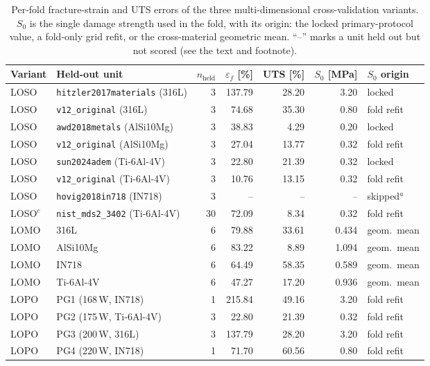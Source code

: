 \documentclass[12pt,a4paper,twocolumn]{article}
\begin{document}
\begin{table}[htbp]
\centering
\caption{Per-fold fracture-strain and UTS errors of the three multi-dimensional cross-validation
variants. $S_0$ is the single damage strength used in the fold, with its origin: the locked
primary-protocol value, a fold-only grid refit, or the cross-material geometric mean. ``--'' marks a unit
held out but not scored (see the text and footnote).}
\label{tab:cv_folds}
\scriptsize
\setlength{\tabcolsep}{3pt}
\begin{tabular}{p{}p{}rrrrp{}}
\toprule
\textbf{Variant} & \textbf{Held-out unit} & \textbf{$n_{\mathrm{held}}$} & \textbf{$\varepsilon_f$ [\%]} & \textbf{UTS [\%]} & \textbf{$S_0$ [MPa]} & \textbf{$S_0$ origin} \\
\midrule
LOSO & \texttt{hitzler2017materials} (316L) & 3 & 137.79 & 28.20 & 3.20 & locked \\
LOSO & \texttt{v12\_original} (316L) & 3 & 74.68 & 35.30 & 0.80 & fold refit \\
LOSO & \texttt{awd2018metals} (AlSi10Mg) & 3 & 38.83 & 4.29 & 0.20 & locked \\
LOSO & \texttt{v12\_original} (AlSi10Mg) & 3 & 27.04 & 13.77 & 0.32 & fold refit \\
LOSO & \texttt{sun2024adem} (Ti-6Al-4V) & 3 & 22.80 & 21.39 & 0.32 & locked \\
LOSO & \texttt{v12\_original} (Ti-6Al-4V) & 3 & 10.76 & 13.15 & 0.32 & fold refit \\
LOSO & \texttt{hovig2018in718} (IN718) & 3 & -- & -- & -- & skipped$^{a}$ \\
LOSO$^{c}$ & \texttt{nist\_mds2\_3402} (Ti-6Al-4V) & 30 & 72.09 & 8.34 & 0.32 & fold refit \\
\midrule
LOMO & 316L & 6 & 79.88 & 33.61 & 0.434 & geom.\ mean \\
LOMO & AlSi10Mg & 6 & 83.22 & 8.89 & 1.094 & geom.\ mean \\
LOMO & IN718 & 6 & 64.49 & 58.35 & 0.589 & geom.\ mean \\
LOMO & Ti-6Al-4V & 6 & 47.27 & 17.20 & 0.936 & geom.\ mean \\
\midrule
LOPO & PG1 (168\,W, IN718) & 1 & 215.84 & 49.16 & 3.20 & fold refit \\
LOPO & PG2 (175\,W, Ti-6Al-4V) & 3 & 22.80 & 21.39 & 0.32 & fold refit \\
LOPO & PG3 (200\,W, 316L) & 3 & 137.79 & 28.20 & 3.20 & fold refit \\
LOPO & PG4 (220\,W, IN718) & 1 & 71.70 & 60.56 & 0.80 & fold refit \\

\end{tabular}
\end{table}
\end{document}
